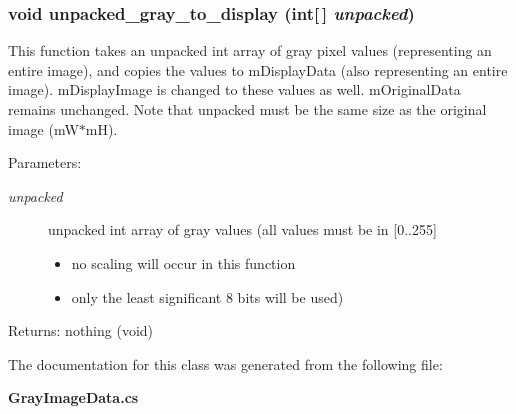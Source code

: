\subsubsection{\setlength{\rightskip}{0pt plus 5cm}void unpacked\_\-gray\_\-to\_\-display (int[$\,$] {\em unpacked})}\label{class_c_s_image_viewer_1_1_gray_image_data_2151cfeeab0ceee3eacce0d83a906054}


This function takes an unpacked int array of gray pixel values (representing an entire image), and copies the values to m\-Display\-Data (also representing an entire image). m\-Display\-Image is changed to these values as well. m\-Original\-Data remains unchanged. Note that unpacked must be the same size as the original image (m\-W$\ast$m\-H). 

\begin{Desc}
\item[Parameters:]
\begin{description}
\item[{\em unpacked}]unpacked int array of gray values (all values must be in [0..255]\begin{itemize}
\item no scaling will occur in this function\item only the least significant 8 bits will be used) \end{itemize}
\end{description}
\end{Desc}
\begin{Desc}
\item[Returns:]nothing (void) \end{Desc}


The documentation for this class was generated from the following file:\begin{CompactItemize}
\item 
{\bf Gray\-Image\-Data.cs}\end{CompactItemize}
